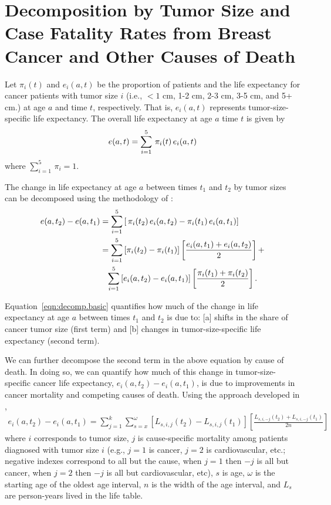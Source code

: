 \documentclass[11pt,letterpaper]{article}
\theoremstyle{plain}
\theoremstyle{remark}
\numberwithin{equation}{section}
\begin{document}
\section{Decomposition by Tumor Size and Case Fatality Rates from
  Breast Cancer and Other Causes of Death}
Let $\pi_i(t)$ and $e_i(a,t)$ be the proportion of patients and the
life expectancy for cancer patients with tumor size $i$ (i.e., $<1$
cm, 1-2 cm, 2-3 cm, 3-5 cm, and 5+ cm.) at age $a$ and time $t$,
respectively. That is, $e_i(a,t)$ represents tumor-size-specific life
expectancy. The overall life expectancy at age $a$ time $t$ is given
by
\begin{eqnarray}
  e(a,t)=\sum_{i=1}^{5}\,\pi_i(t)\,e_i(a,t) \notag
\end{eqnarray}
where $\sum_{i=1}^{5}\,\pi_i=1$. 

The change in life expectancy at age $a$ between times $t_1$ and $t_2$
by tumor sizes can be decomposed using the methodology of \cite{Kitagawa55}:
\begin{align}
  e(a,t_2)-e(a,t_1)&=\sum_{i=1}^{5}\left[\,\pi_i(t_2)\,e_i(a,t_2)- \pi_i(t_1)\,e_i(a,t_1)\right]  \notag\\
  \hspace{-0.7in} &=\sum_{i=1}^{5}\left[\pi_i(t_2)-\pi_i(t_1)
  \right]\left[\frac{e_i(a,t_1)+e_i(a,t_2)}{2}\right]+ \notag\\
  &\phantom{=}\sum_{i=1}^{5}\left[e_i(a,t_2)-e_i(a,t_1)
  \right]\left[\frac{\pi_i(t_1)+\pi_i(t_2)}{2}\right].
 \label{eqn:decomp.basic}
\end{align}
 
Equation~\ref{eqn:decomp.basic} quantifies how much of the change in life
expectancy at age $a$ between times $t_1$ and $t_2$ is due to: [a]
shifts in the share of cancer tumor size (first term) and [b] changes
in tumor-size-specific life expectancy (second term).

We can further decompose the second term in the above equation by
cause of death. In doing so, we can quantify how much of this change
in tumor-size-specific cancer life expectancy,
$e_i(a,t_2)-e_i(a,t_1)$, is due to improvements in cancer mortality
and competing causes of death.  Using the approach developed in
\cite{BelPreCan08},
\begin{eqnarray}
e_i(a,t_2)-e_i(a,t_1)=\sum_{j=1}^{k} \sum_{s=x}^{\omega}\left[L_{s,i,j}(t_2)-L_{s,i,j}(t_1) \right] \left[\frac{L_{s,i,-j}(t_2)+L_{s,i,-j}(t_1) }{2n} \right]
\label{eqn:causedecomp}
\end{eqnarray}
where $i$ corresponds to tumor size, $j$ is cause-specific mortality
among patients diagnosed with tumor size $i$ (e.g., $j=1$ is cancer, 
$j=2$ is cardiovascular, etc.; negative indexes correspond to all but the cause, when $j=1$ then  $-j$ is all but cancer, when $j=2$ then  $-j$ is all but cardiovascular, etc), $s$ is age, $\omega$ is the starting
age of the oldest age interval, $n$ is the width of the age interval,
and $L_s$ are person-years lived in the life table.
\end{document}
